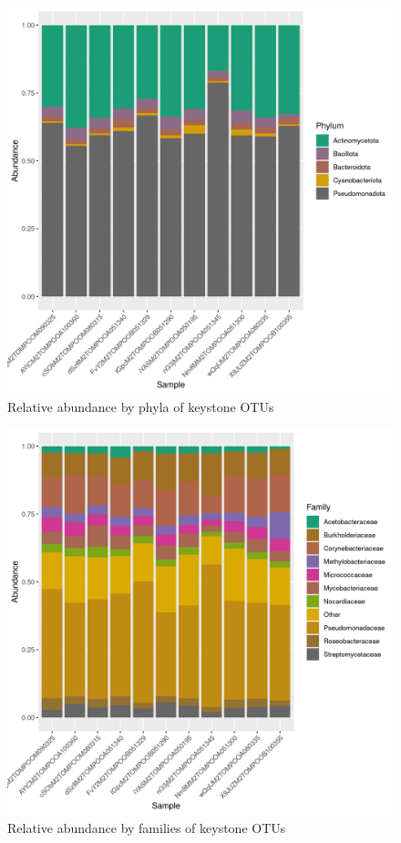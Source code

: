 \begin{figure}
\centering
\includegraphics[scale = 0.8]{tomate_aleatorio1_5.csv_relative_abundance_Phylum.png}
\caption{Relative abundance by phyla of keystone OTUs }
\label{fig:tomate_aleatorio1_5.csv_phyla}
\end{figure}
\begin{figure}
\centering
\includegraphics[scale = 0.8]{tomate_aleatorio1_5.csv_relative_abundance_Family.png}
\caption{Relative abundance by families of keystone OTUs }
\label{fig:tomate_aleatorio1_5.csv_family}
\end{figure}
